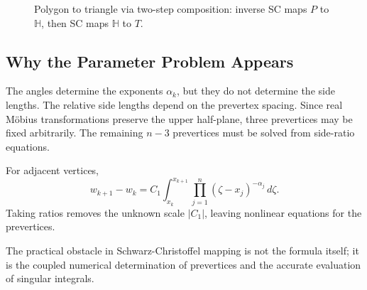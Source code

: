\documentclass[12pt,a4paper]{article}
\begin{document}
\begin{figure}[H]
\centering
{}
\caption{Polygon to triangle via two-step composition: inverse SC maps \(P\) to \(\mathbb{H}\), then SC maps \(\mathbb{H}\) to \(T\).}
\end{figure}

\subsection{Why the Parameter Problem Appears}

The angles determine the exponents \(\alpha_k\), but they do not determine the side lengths. The relative side lengths depend on the prevertex spacing. Since real Möbius transformations preserve the upper half-plane, three prevertices may be fixed arbitrarily. The remaining \(n-3\) prevertices must be solved from side-ratio equations.

For adjacent vertices,
\[
w_{k+1}-w_k=C_1\int_{x_k}^{x_{k+1}}\prod_{j=1}^{n}(\zeta-x_j)^{-\alpha_j}\,d\zeta.
\]
Taking ratios removes the unknown scale \(|C_1|\), leaving nonlinear equations for the prevertices.

\begin{importantbox}
The practical obstacle in Schwarz-Christoffel mapping is not the formula itself; it is the coupled numerical determination of prevertices and the accurate evaluation of singular integrals.
\end{importantbox}
\end{document}
